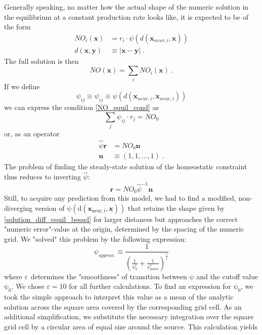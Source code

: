 \documentclass[10pt,a4paper]{article}
\begin{document}
Generally speaking, no matter how the actual shape of the numeric solution in the equilibrium at a constant production rate looks like, it is expected to be of the form
\begin{align}
NO_i(\mathbf{x}) &= r_i \cdot \psi (d(\mathbf{x}_{neur,i},\mathbf{x})) \label{general_diff_interaction} \\
d(\mathbf{x},\mathbf{y}) &\equiv |\mathbf{x}-\mathbf{y}| \; . \label{eucl_dist}
\end{align}
The full solution is then
\begin{equation}
NO(\mathbf{x}) = \sum_i NO_i(\mathbf{x})\;.
\label{full_sol_diff_equil}
\end{equation}
If we define
\begin{equation}
\psi_{ij} \equiv \psi_{ij} \equiv \psi (d(\mathbf{x}_{neur,i},\mathbf{x}_{neur,i}))
\label{interact_matrix_elements}
\end{equation}
we can express the condition \eqref{NO_equil_cond} as
\begin{equation}
\sum_j \psi_{ij}\cdot r_j = NO_0
\label{NO_equil_cond_interact_matrix}
\end{equation}
or, as an operator
\begin{align}
\hat{\psi}\mathbf{r} &= NO_0 \mathbf{n} \label{NO_equil_cond_interact_matrix_operator} \\
\mathbf{n}&\equiv (1,1,...,1) \; .
\end{align}
The problem of finding the steady-state solution of the homeostatic constraint thus reduces to inverting $\hat{\psi}$:
\begin{equation}
\mathbf{r} = NO_0 \hat{\psi}^{-1} \mathbf{n}
\label{NO_euqil_cond_interact_matrix_operator_solve}
\end{equation}
Still, to acquire any prediction from this model, we had to find a modified, non-diverging version of $\mathrm{\psi (d(\mathbf{x}_{neur,i},\mathbf{x}))}$ that retains the shape given by \eqref{solution_diff_equil_bessel} for larger distances but approaches the correct "numeric error"-value at the origin, determined by the spacing of the numeric grid. We "solved" this problem by the following expression:
\begin{equation}
\psi_{approx.} \equiv \frac{1}{\left(\frac{1}{\psi_0^\varepsilon} + \frac{1}{\psi_{point}^\varepsilon}\right)^{\frac{1}{\varepsilon}}}
\label{Numeric_Solution_Expression_Trick}
\end{equation}
where $\mathrm{\varepsilon}$ determines the "smoothness" of transition between $\mathrm{\psi}$ and the cutoff value $\mathrm{\psi_0}$. We chose $\varepsilon=10$ for all further calculations. To find an expression for $\mathrm{\psi_0}$, we took the simple approach to interpret this value as a mean of the analytic solution across the square area covered by the corresponding grid cell. As an additional simplification, we substitute the necessary integration over the square grid cell by a circular area of equal size around the source. This calculation yields
\end{document}
